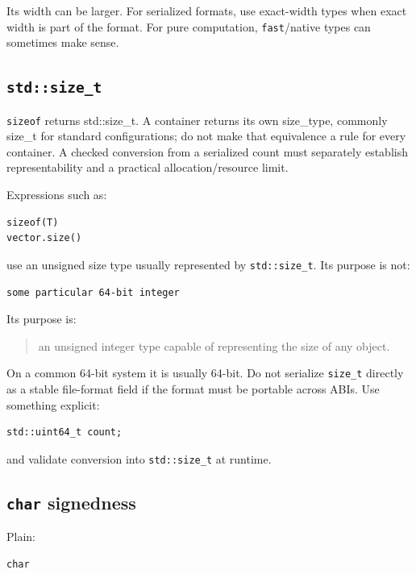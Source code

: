 Its width can be larger. For serialized formats, use exact-width types when exact width is part of the format. For pure computation, \texttt{fast}/native types can sometimes make sense.

\subsection{\texorpdfstring{\texttt{std::size\_t}}{std::size\_t}}\label{01-foundations-i-ch002-stdsize_t}

\texttt{sizeof} returns std::size\_t. A container returns its own size\_type, commonly size\_t for standard configurations; do not make that equivalence a rule for every container. A checked conversion from a serialized count must separately establish representability and a practical allocation/resource limit.

Expressions such as:

\begin{verbatim}
sizeof(T)
vector.size()
\end{verbatim}

use an unsigned size type usually represented by \texttt{std::size\_t}. Its purpose is not:

\begin{verbatim}
some particular 64-bit integer
\end{verbatim}

Its purpose is:

\begin{quote}
an unsigned integer type capable of representing the size of any object.
\end{quote}

On a common 64-bit system it is usually 64-bit. Do not serialize \texttt{size\_t} directly as a stable file-format field if the format must be portable across ABIs. Use something explicit:

\begin{verbatim}
std::uint64_t count;
\end{verbatim}

and validate conversion into \texttt{std::size\_t} at runtime.

\subsection{\texorpdfstring{\texttt{char} signedness}{char signedness}}\label{01-foundations-i-ch002-char-signedness}

Plain:

\begin{verbatim}
char
\end{verbatim}

